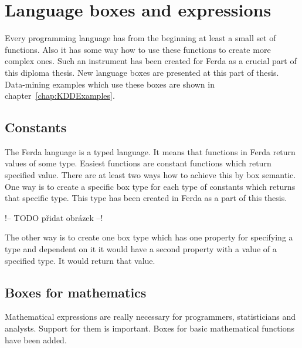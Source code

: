 \documentclass[a4paper,12pt]{book}
\begin{document}
\section{Language boxes and expressions}
\label{sectionNewBoxes}
Every programming language has from the beginning at least a small set of functions. Also it has some way how to use these functions to create more complex ones. Such an instrument has been created for Ferda as a crucial part of this diploma thesis. New language boxes are presented at this part of thesis. Data-mining examples which use these boxes are shown in chapter~\ref{chap:KDDExamples}.

\subsection{Constants}
The Ferda language is a typed language. It means that functions in Ferda return values of some type. Easiest functions are constant functions which return specified value. There are at least two ways how to achieve this by box semantic. One way is to create a specific box type for each type of constants which returns that specific type. This type has been created in Ferda as a part of this thesis.

!-- TODO přidat obrázek --!

The other way is to create one box type which has one property for specifying a type and dependent on it it would have a second property with a value of a specified type. It would return that value.

\subsection{Boxes for mathematics}
Mathematical expressions are really necessary for programmers, statisticians and analysts. Support for them is important. Boxes for basic mathematical functions have been added.
\end{document}
